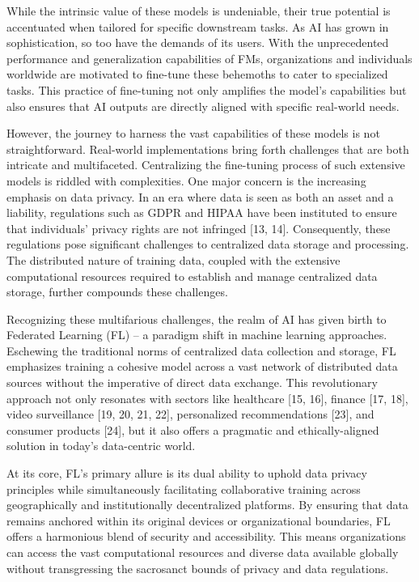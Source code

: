 \documentclass[withindex,glossary,firstyr]{cam-thesis}
\begin{document}
While the intrinsic value of these models is undeniable, their true potential is accentuated when tailored for specific downstream tasks. As AI has grown in sophistication, so too have the demands of its users. With the unprecedented performance and generalization capabilities of FMs, organizations and individuals worldwide are motivated to fine-tune these behemoths to cater to specialized tasks. This practice of fine-tuning not only amplifies the model's capabilities but also ensures that AI outputs are directly aligned with specific real-world needs.

However, the journey to harness the vast capabilities of these models is not straightforward. Real-world implementations bring forth challenges that are both intricate and multifaceted. Centralizing the fine-tuning process of such extensive models is riddled with complexities. One major concern is the increasing emphasis on data privacy. In an era where data is seen as both an asset and a liability, regulations such as GDPR and HIPAA have been instituted to ensure that individuals' privacy rights are not infringed [13, 14]. Consequently, these regulations pose significant challenges to centralized data storage and processing. The distributed nature of training data, coupled with the extensive computational resources required to establish and manage centralized data storage, further compounds these challenges.

Recognizing these multifarious challenges, the realm of AI has given birth to Federated Learning (FL) – a paradigm shift in machine learning approaches. Eschewing the traditional norms of centralized data collection and storage, FL emphasizes training a cohesive model across a vast network of distributed data sources without the imperative of direct data exchange. This revolutionary approach not only resonates with sectors like healthcare [15, 16], finance [17, 18], video surveillance [19, 20, 21, 22], personalized recommendations [23], and consumer products [24], but it also offers a pragmatic and ethically-aligned solution in today's data-centric world.

At its core, FL's primary allure is its dual ability to uphold data privacy principles while simultaneously facilitating collaborative training across geographically and institutionally decentralized platforms. By ensuring that data remains anchored within its original devices or organizational boundaries, FL offers a harmonious blend of security and accessibility. This means organizations can access the vast computational resources and diverse data available globally without transgressing the sacrosanct bounds of privacy and data regulations.
\end{document}
